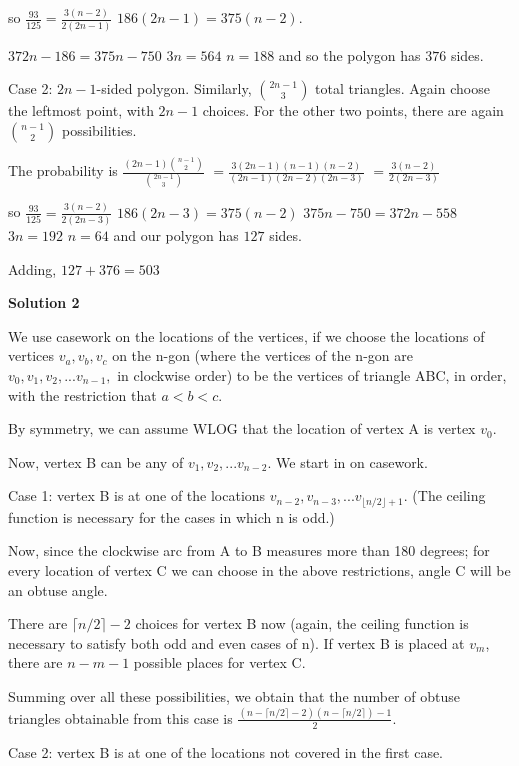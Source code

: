 \begin{enumerate}
 so $\frac{93}{125}=\frac{3(n-2)}{2(2n-1)}$
$186(2n-1)=375(n-2)$.

 $372n-186=375n-750$
$3n=564$
$n=188$ and so the polygon has $376$ sides.

 Case 2: $2n-1$-sided polygon. Similarly, $\binom{2n-1}{3}$ total triangles. Again choose the leftmost point, with $2n-1$ choices. For the other two points, there are again $\binom{n-1}{2}$ possibilities.

 The probability is $\frac{(2n-1)\binom{n-1}{2}}{\binom{2n-1}{3}}$
$=\frac{3(2n-1)(n-1)(n-2)}{(2n-1)(2n-2)(2n-3)}$
$=\frac{3(n-2)}{2(2n-3)}$

 so $\frac{93}{125}=\frac{3(n-2)}{2(2n-3)}$
$186(2n-3)=375(n-2)$
$375n-750=372n-558$
$3n=192$
$n=64$ and our polygon has $127$ sides.

 Adding, $127+376=\boxed{503}$




\textbf{Solution 2}

We use casework on the locations of the vertices, if we choose the locations of vertices $v_a, v_b, v_c$ on the n-gon (where the vertices of the n-gon are $v_0, v_1, v_2, ... v_{n-1},$ in clockwise order) to be the vertices of triangle ABC, in order, with the restriction that $a<b<c$.

 By symmetry, we can assume WLOG that the location of vertex A is vertex $v_0$.

 Now, vertex B can be any of $v_1, v_2, ... v_{n-2}$.  We start in on casework.

 Case 1: vertex B is at one of the locations $v_{n-2}, v_{n-3}, ... v_{\lfloor n/2 \rfloor +1}$. (The ceiling function is necessary for the cases in which n is odd.)

 Now, since the clockwise arc from A to B measures more than 180 degrees; for every location of vertex C we can choose in the above restrictions, angle C will be an obtuse angle.

 There are $\lceil n/2 \rceil - 2$ choices for vertex B now (again, the ceiling function is necessary to satisfy both odd and even cases of n).  If vertex B is placed at $v_m$, there are $n - m - 1$ possible places for vertex C.

 Summing over all these possibilities, we obtain that the number of obtuse triangles obtainable from this case is $\frac{(n- \lceil n/2 \rceil - 2)(n - \lceil n/2 \rceil) - 1}{2}$.

 
Case 2: vertex B is at one of the locations not covered in the first case.


\end{enumerate}
